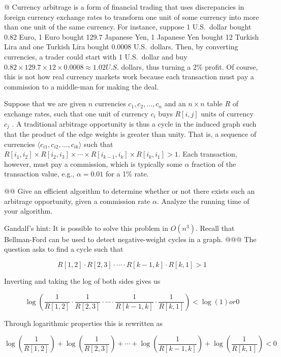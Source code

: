 \documentclass[10pt]{article}\usepackage[]{graphicx}\usepackage[]{xcolor}
\begin{document}
\begin{easylist}[enumerate]
    @ Currency arbitrage is a form of financial trading that uses discrepancies in foreign currency exchange rates to
    transform one unit of some currency into more than one unit of the same currency. For instance, suppose 1 U.S.\
    dollar bought 0.82 Euro, 1 Euro bought 129.7 Japanese Yen, 1 Japanese Yen bought 12 Turkish Lira and one Turkish
    Lira bought 0.0008 U.S.\ dollars. Then, by converting currencies, a trader could start with 1 U.S.\ dollar and buy
    $0.82 \times 129.7 \times 12 \times 0.0008 \approx 1.02 U.S.$ dollars, thus turning a 2\% profit. Of course, this is
    not how real currency markets work because each transaction must pay a commission to a middle-man for making the
    deal.

    Suppose that we are given $n$ currencies $c_1 , c_2 , \ldots , c_n$ and an $n \times n$ table $R$ of exchange rates,
    such that one unit of currency $c_i$ buys $R[i, j]$ units of currency $c_j$ . A traditional arbitrage opportunity is
    thus a cycle in the induced graph such that the product of the edge weights is greater than unity. That is, a
    sequence of currencies $\langle c_{i1} , c_{i 2} ,\ldots , c_{i k} \rangle$ such that $R[i_1 , i_2] \times R[i_2 ,
    i_3] \times \cdots \times R[i_{k-1} , i_k ] \times R[i_k , i_1 ] > 1$. Each transaction, however, must pay a
    commission, which is typically some $\alpha$ fraction of the transaction value, e.g., $\alpha = 0.01$ for a 1\%
    rate.

    @@ Give an efficient algorithm to determine whether or not there exists such an arbitrage
    opportunity, given a commission rate $\alpha$. Analyze the running time of your algorithm.

    Gandalf's hint: It is possible to solve this problem in $O(n^3)$. Recall that Bellman-Ford can be used to detect
    negative-weight cycles in a graph.
    @@@ The question asks to find a cycle such that

    \[
        R[1,2] \cdot R[2,3] \cdot \cdots \cdot R[k-1, k] \cdot R[k,1] > 1
    \]

    Inverting and taking the log of both sides gives us

    \[
        \log\left(\frac{1}{R[1,2]} \cdot \frac{1}{R[2,3]} \cdot \cdots
            \cdot \frac{1}{R[k-1, k]} \cdot \frac{1}{R[k,1]}\right) < \log(1) or 0
    \]

    Through logarithmic properties this is rewritten as

    \[
        \log\left(\frac{1}{R[1,2]}\right) +
            \log\left(\frac{1}{R[2,3]}\right) +
            \cdots + \log\left(\frac{1}{R[k-1,k]}\right) +
            \log\left(\frac{1}{R[k,1]}\right) < 0
    \]


\end{easylist}
\end{document}
